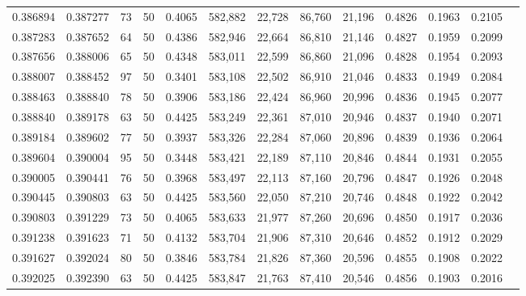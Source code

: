 \begin{tabular}{rrrrrrrrrrrrr}
0.386894 & 0.387277 &    73 &  50 &                                     0.4065 & 582,882 &  22,728 &  86,760 &  21,196 & 0.4826 & 0.1963 & 0.2105 \\
0.387283 & 0.387652 &    64 &  50 &                                     0.4386 & 582,946 &  22,664 &  86,810 &  21,146 & 0.4827 & 0.1959 & 0.2099 \\
0.387656 & 0.388006 &    65 &  50 &                                     0.4348 & 583,011 &  22,599 &  86,860 &  21,096 & 0.4828 & 0.1954 & 0.2093 \\
0.388007 & 0.388452 &    97 &  50 &                                     0.3401 & 583,108 &  22,502 &  86,910 &  21,046 & 0.4833 & 0.1949 & 0.2084 \\
0.388463 & 0.388840 &    78 &  50 &                                     0.3906 & 583,186 &  22,424 &  86,960 &  20,996 & 0.4836 & 0.1945 & 0.2077 \\
0.388840 & 0.389178 &    63 &  50 &                                     0.4425 & 583,249 &  22,361 &  87,010 &  20,946 & 0.4837 & 0.1940 & 0.2071 \\
0.389184 & 0.389602 &    77 &  50 &                                     0.3937 & 583,326 &  22,284 &  87,060 &  20,896 & 0.4839 & 0.1936 & 0.2064 \\
0.389604 & 0.390004 &    95 &  50 &                                     0.3448 & 583,421 &  22,189 &  87,110 &  20,846 & 0.4844 & 0.1931 & 0.2055 \\
0.390005 & 0.390441 &    76 &  50 &                                     0.3968 & 583,497 &  22,113 &  87,160 &  20,796 & 0.4847 & 0.1926 & 0.2048 \\
0.390445 & 0.390803 &    63 &  50 &                                     0.4425 & 583,560 &  22,050 &  87,210 &  20,746 & 0.4848 & 0.1922 & 0.2042 \\
0.390803 & 0.391229 &    73 &  50 &                                     0.4065 & 583,633 &  21,977 &  87,260 &  20,696 & 0.4850 & 0.1917 & 0.2036 \\
0.391238 & 0.391623 &    71 &  50 &                                     0.4132 & 583,704 &  21,906 &  87,310 &  20,646 & 0.4852 & 0.1912 & 0.2029 \\
0.391627 & 0.392024 &    80 &  50 &                                     0.3846 & 583,784 &  21,826 &  87,360 &  20,596 & 0.4855 & 0.1908 & 0.2022 \\
0.392025 & 0.392390 &    63 &  50 &                                     0.4425 & 583,847 &  21,763 &  87,410 &  20,546 & 0.4856 & 0.1903 & 0.2016 \\

\end{tabular}

